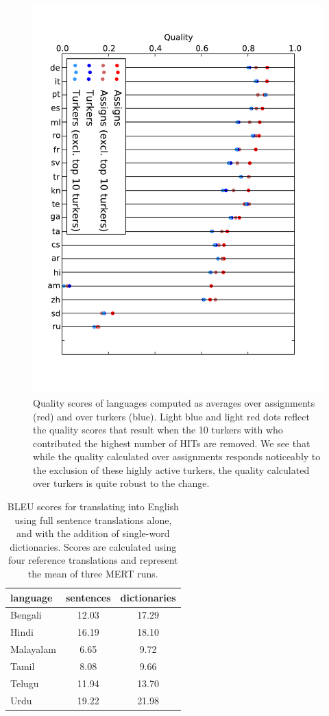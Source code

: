 \documentclass[11pt]{article}
\begin{document}
\begin{figure}
\includegraphics[width=1\linewidth]{figures/quality_compare.pdf}
\caption{Quality scores of languages computed as averages over assignments (red) and over turkers (blue). Light blue and light red dots reflect the quality scores that result when the 10 turkers with who contributed the highest number of HITs are removed. We see that while the quality calculated over assignments responds noticeably to the exclusion of these highly active turkers, the quality calculated over turkers is quite robust to the change.}
\label{qual_dots}
\end{figure}


\begin{table}[t]
\centering
\begin{tabular}{l|cc}
  language  & sentences &  dictionaries \\
  \hline\hline
  Bengali    &  12.03 & 17.29\\
  Hindi      & 16.19 & 18.10\\  
  Malayalam    &  6.65 & 9.72\\      
  Tamil      & 8.08 & 9.66 \\  
  Telugu     & 11.94 & 13.70\\  
  Urdu        & 19.22 & 21.98\\   
\end{tabular}
\caption{BLEU scores for translating into English using full sentence translations alone, and with the addition of single-word dictionaries. Scores are calculated using four reference translations and represent the mean of three MERT runs.}
\label{dictionary_bleu}
\end{table}
\end{document}
